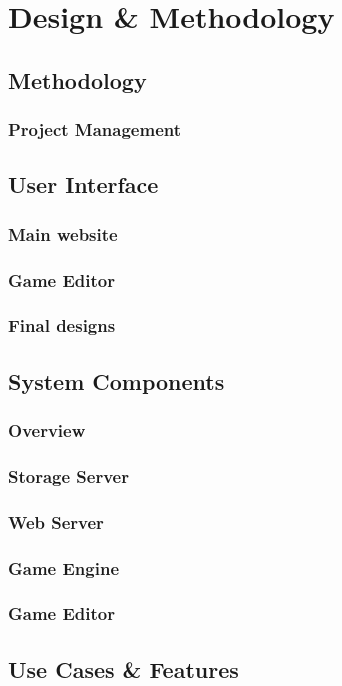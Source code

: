 \chapter{Design \& Methodology}

\section{Methodology}
	\subsection{Project Management}

\section{User Interface}
	\subsection{Main website}

	\subsection{Game Editor}

	\subsection{Final designs}

\section{System Components}
	\subsection{Overview}


	\subsection{Storage Server}

	\subsection{Web Server}

	\subsection{Game Engine}

	\subsection{Game Editor}

\section{Use Cases \& Features}
